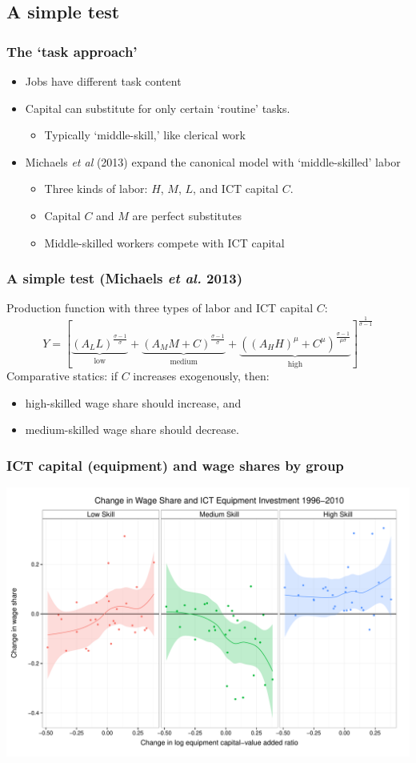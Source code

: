 \documentclass[red]{beamer}
\newcommand{\vitem}{\vfill\item}
\begin{document}
\subsection{A simple test}
\begin{frame}
\frametitle{The `task approach'}
\begin{itemize}
\vitem Jobs have different task content
\vitem Capital can substitute for only certain `routine' tasks.
  \begin{itemize}
  \item Typically `middle-skill,' like clerical work
  \end{itemize}
\vitem Michaels {\em et al} (2013) expand the canonical model with `middle-skilled' labor
  \begin{itemize}
  \item Three kinds of labor: $H$, $M$, $L$, and ICT capital $C$. 
  \item Capital $C$ and $M$ are perfect substitutes
  \item Middle-skilled workers compete with ICT capital
  \end{itemize}
\end{itemize}
\end{frame}

\begin{frame}[c]
  \frametitle{A simple test (Michaels {\em et al.} 2013)}
Production function with three types of labor and ICT capital $C$:
$$
Y = \left[
  \underbrace{(A_LL)^\frac{\sigma-1}{\sigma}}_{\text{low}}
  +
  \underbrace{(A_MM + C)^\frac{\sigma-1}{\sigma}}_{\text{medium}}
  +
  \underbrace{((A_HH)^\mu + C^\mu)^\frac{\sigma-1}{\mu\sigma}}_{\text{high}}
  \right]^\frac{1}{\sigma-1}
$$
\pause
Comparative statics: if $C$ increases exogenously, then: 
\begin{itemize}
\vitem high-skilled wage share should increase, and 
\vitem medium-skilled wage share should decrease.
\end{itemize}
\end{frame}

\begin{frame}[c]
  \frametitle{ICT capital (equipment) and wage shares by group}
\begin{center}
\includegraphics[width=\textwidth]{slides_fig/wage_share_equipment_skill.pdf}
\end{center}
\end{frame}
\end{document}
